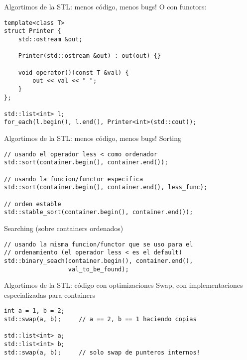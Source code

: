 \begin{frame}[fragile]{Algortimos de la STL: menos c\'odigo, menos bugs!}
O con functors:
      \begin{lstlisting}[style=normal]
template<class T>
struct Printer {
    std::ostream &out;

    Printer(std::ostream &out) : out(out) {}

    void operator()(const T &val) {
        out << val << " ";
    }
};

std::list<int> l;
for_each(l.begin(), l.end(), Printer<int>(std::cout));
      \end{lstlisting}
\end{frame}

\begin{frame}[fragile]{Algortimos de la STL: menos c\'odigo, menos bugs!}
Sorting
      \begin{lstlisting}[style=normal]
// usando el operador less < como ordenador
std::sort(container.begin(), container.end());

// usando la funcion/functor especifica
std::sort(container.begin(), container.end(), less_func);

// orden estable
std::stable_sort(container.begin(), container.end());
      \end{lstlisting}
\vphantom{X}
Searching (sobre containers ordenados)
      \begin{lstlisting}[style=normal]
// usando la misma funcion/functor que se uso para el
// ordenamiento (el operador less < es el default)
std::binary_seach(container.begin(), container.end(),
                  val_to_be_found);
      \end{lstlisting}
\end{frame}



\begin{frame}[fragile]{Algortimos de la STL: c\'odigo con optimizaciones}
Swap, con implementaciones especializadas para containers
      \begin{lstlisting}[style=normal]
int a = 1, b = 2;
std::swap(a, b);     // a == 2, b == 1 haciendo copias

std::list<int> a;
std::list<int> b;
std::swap(a, b);     // solo swap de punteros internos!
      \end{lstlisting}
\end{frame}



